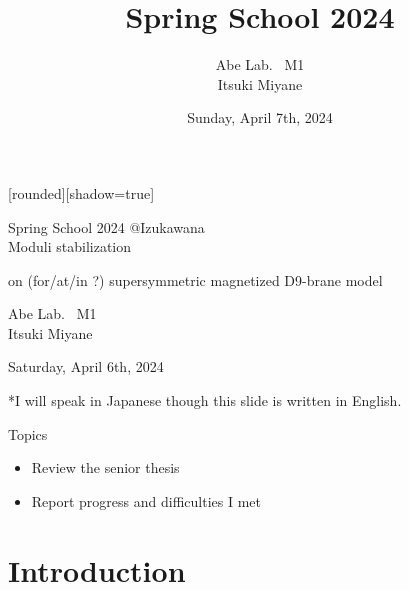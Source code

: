\documentclass[
  unicode,a4paper,10pt,
  xcolor = {dvipsnames,svgnames},
  hyperref ={colorlinks=true,citecolor=Navy,linkcolor=NavyBlue,urlcolor=purple},
  ja=standard,lualatex
]{beamer}
\title{
  Spring School 2024
}
\author{
  Abe Lab. \ M1
  \texorpdfstring{\\}{}
  \texorpdfstring{\vspace*{3pt}}{}
  Itsuki Miyane
}
\date{Sunday, April 7th, 2024}
\begin{document}
\begin{frame}

  [rounded][shadow=true]

  \begin{block}{}
    \centering
    Spring School 2024 @Izukawana
    \\
    \Large
    Moduli stabilization

    on (for/at/in ?) supersymmetric magnetized D9-brane model
  \end{block}

  \begin{center}
    Abe Lab. \ M1 \\
    Itsuki Miyane

    \vspace*{5pt}

    Saturday, April 6th, 2024
  \end{center}

  \begin{center}
    *I will speak in Japanese though this slide is written in English.
  \end{center}
\end{frame}

\begin{frame}{Topics}
  \begin{itemize}
    \item
          Review the senior thesis
    \item
          Report progress and difficulties I met
  \end{itemize}
\end{frame}


\section{Introduction}

\begin{frame}
  \huge \secname
\end{frame}
\end{document}
